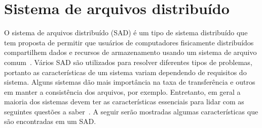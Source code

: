 	
	
	
	\section{Sistema de arquivos distribuído}
	
	O sistema de arquivos distribuído (SAD) é um tipo de sistema distribuído que tem proposta de permitir que usuários de computadores fisicamente distribuídos compartilhem dados e recursos de armazenamento usando um sistema de arquivo comum~\cite{levy90}.
	Vários SAD são utilizados para resolver diferentes tipos de problemas, portanto as características de um sistema variam dependendo de requisitos do sistema. 
	Alguns sistemas dão mais importância na taxa de transferência e outros em manter a consistência dos arquivos, por exemplo. Entretanto, em geral a maioria dos sistemas devem ter as características essenciais para lidar com as seguintes questões a saber~\cite{tanenbaum07,coulouris06, galli00, kon94}.
	A seguir serão mostradas algumas características que são encontradas em um SAD.
	\\
	

